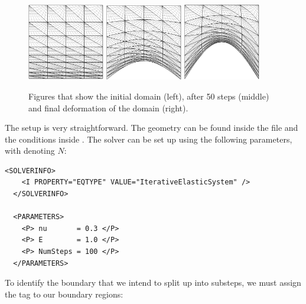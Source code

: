 \begin{figure}
  \begin{center}
    \includegraphics[width=0.3\textwidth]{Figures/bl-0}
    \includegraphics[width=0.3\textwidth]{Figures/bl-1}
    \includegraphics[width=0.3\textwidth]{Figures/bl-2}
  \end{center}
  \caption{Figures that show the initial domain (left), after 50 steps (middle)
    and final deformation of the domain (right).}
  \label{fig:elas:bl}
\end{figure}

The setup is very straightforward. The geometry can be found inside the file
 and the conditions inside
. The solver can be set up using the following
parameters, with  denoting $N$:

\begin{lstlisting}[style=XMLStyle]
  <SOLVERINFO>
    <I PROPERTY="EQTYPE" VALUE="IterativeElasticSystem" />
  </SOLVERINFO>
  
  <PARAMETERS>
    <P> nu       = 0.3 </P>
    <P> E        = 1.0 </P>
    <P> NumSteps = 100 </P>
  </PARAMETERS>
\end{lstlisting}

To identify the boundary that we intend to split up into substeps, we must
assign the  tag to our boundary regions:

